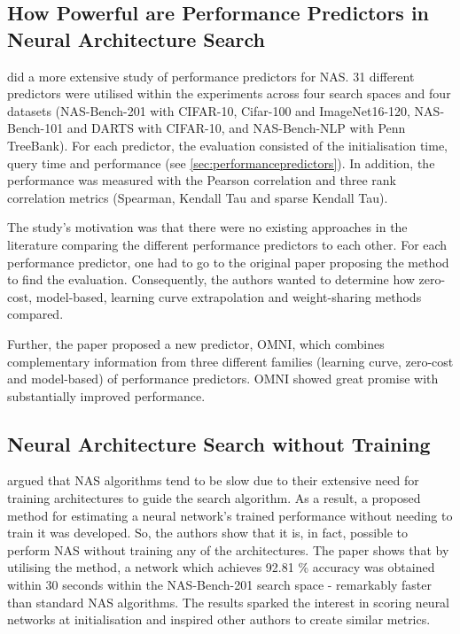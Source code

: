 \subsection{How Powerful are Performance Predictors in Neural Architecture Search}

\cite{white2021powerful} did a more extensive study of performance predictors for \gls{NAS}. 31 different predictors were utilised within the experiments across four search spaces and four datasets (NAS-Bench-201 with CIFAR-10, Cifar-100 and ImageNet16-120, NAS-Bench-101 and DARTS with CIFAR-10, and NAS-Bench-NLP with Penn TreeBank). For each predictor, the evaluation consisted of the initialisation time, query time and performance (see \cref{sec:performancepredictors}). In addition, the performance was measured with the Pearson correlation and three rank correlation metrics (Spearman, Kendall Tau and sparse Kendall Tau). 

The study's motivation was that there were no existing approaches in the literature comparing the different performance predictors to each other. For each performance predictor, one had to go to the original paper proposing the method to find the evaluation. Consequently, the authors wanted to determine how zero-cost, model-based, learning curve extrapolation and weight-sharing methods compared. 

Further, the paper proposed a new predictor, OMNI, which combines complementary information from three different families (learning curve, zero-cost and model-based) of performance predictors. OMNI showed great promise with substantially improved performance. 

\subsection{Neural Architecture Search without Training}
\cite{mellor2021neural} argued that \gls{NAS} algorithms tend to be slow due to their extensive need for training architectures to guide the search algorithm. As a result, a proposed method for estimating a neural network's trained performance without needing to train it was developed. So, the authors show that it is, in fact, possible to perform \gls{NAS} without training any of the architectures. The paper shows that by utilising the method, a network which achieves 92.81 \% accuracy was obtained within 30 seconds within the NAS-Bench-201 search space - remarkably faster than standard \gls{NAS} algorithms. The results sparked the interest in scoring neural networks at initialisation and inspired other authors to create similar metrics. 

